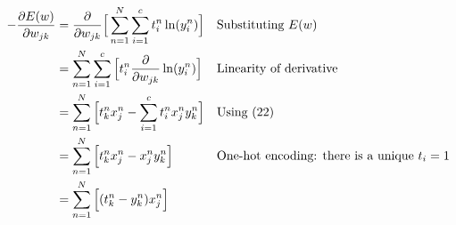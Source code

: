 \documentclass{article} %
\begin{document}
\begin{align}
  - \pdv{E(w)}{w_{jk}}
  &= \pdv{}{w_{jk}} \Big[\sum_{n=1}^{N} \sum_{i=1}^{c} t_i^n \ln(y_i^n)\Big]
  && \text{Substituting $E(w)$}\\
  &= \sum_{n=1}^{N} \sum_{i=1}^{c} \Big[t_i^n \pdv{}{w_{jk}} \ln(y_i^n)\Big]
  && \text{Linearity of derivative}\\
  &= \sum_{n=1}^{N} \Big[t_k^n x_j^n - \sum_{i=1}^{c} t_i^n x_j^n y_k^n\Big]
  && \text{Using (22)}\\
  &= \sum_{n=1}^{N} \Big[t_k^n x_j^n - x_j^n y_k^n\Big]
  && \text{One-hot encoding: there is a unique $t_i = 1$}\\
  &= \sum_{n=1}^{N} \Big[(t_k^n - y_k^n) x_j^n\Big]
  && \text{}
\end{align}
\end{document}

